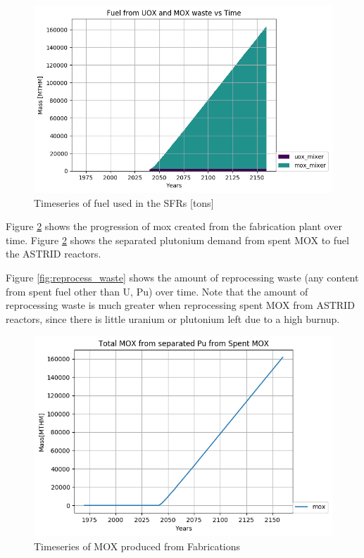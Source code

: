 \begin{figure}[htbp!]
	\begin{center}
		\includegraphics[scale=0.7]{./images/french-transition/where_fuel.png}
	\end{center}
	\caption{Timeseries of fuel used in the \gls{SFR}s [tons]}
	\label{fig:fuel}
\end{figure}

Figure \ref{fig:mox_fab} shows the progression of mox created from
the fabrication plant over time. Figure \ref{fig:mox_fab} shows
the separated plutonium demand from spent \gls{MOX} to fuel the 
ASTRID reactors.

Figure \ref{fig:reprocess_waste} shows the amount of reprocessing waste
(any content from spent fuel other than U, Pu) over time. Note that 
the amount of reprocessing waste is much greater when reprocessing
spent \gls{MOX} from ASTRID reactors, since there is little uranium
or plutonium left due to a high burnup.

\begin{figure}[htbp!]
	\begin{center}
		\includegraphics[scale=0.7]{./images/french-transition/mox_from_mixer.png}
	\end{center}
	\caption{Timeseries of MOX produced from Fabrications}
	\label{fig:mox_fab}
\end{figure}


